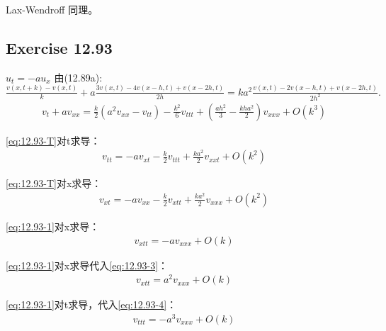 \documentclass[UTF8]{ctexart}
\begin{document}
Lax-Wendroff 同理。




\subsection*{Exercise 12.93}
$u_t = -au_x$
由(12.89a):$\frac{v(x,t+k)-v(x,t)}{k} + a\frac{3v(x,t) - 4v(x-h,t) + v(x-2h,t)}{2h} = ka^2\frac{v(x,t) - 2v(x-h,t) + v(x-2h,t)}{2h^2}.$
\begin{equation}
    \label{eq:12.93-T}
    \begin{aligned}
        v_t + av_{xx} = \frac{k}{2}(a^2v_{xx}-v_{tt})-\frac{k^2}{6}v_{ttt}+(\frac{ah^2}{3}-\frac{kha^2}{2})v_{xxx}+O(k^3)
    \end{aligned}
\end{equation}

\eqref{eq:12.93-T}对t求导：
\begin{equation}
    \label{eq:12.93-1}
    \begin{aligned}
        v_{tt} = -av_{xt} - \frac{k}{2}v_{ttt} + \frac{ka^2}{2}v_{xxt} + O(k^2)
    \end{aligned}
\end{equation}

\eqref{eq:12.93-T}对x求导：
\begin{equation}
    \label{eq:12.93-2}
    \begin{aligned}
        v_{xt} = -av_{xx} - \frac{k}{2}v_{xtt} + \frac{ka^2}{2}v_{xxx} + O(k^2)
    \end{aligned}
\end{equation}

\eqref{eq:12.93-1}对x求导：
\begin{equation}
    \label{eq:12.93-3}
    \begin{aligned}
        v_{xtt} = -av_{xxx} + O(k)
    \end{aligned}
\end{equation}

\eqref{eq:12.93-1}对x求导代入\eqref{eq:12.93-3}：
\begin{equation}
    \label{eq:12.93-4}
    \begin{aligned}
        v_{xtt} = a^2v_{xxx} + O(k)
    \end{aligned}
\end{equation}

\eqref{eq:12.93-1}对t求导，代入\eqref{eq:12.93-4}：
\begin{equation}
    \label{eq:12.93-5}
    \begin{aligned}
        v_{ttt} = -a^3v_{xxx} + O(k)
    \end{aligned}
\end{equation}
\end{document}
